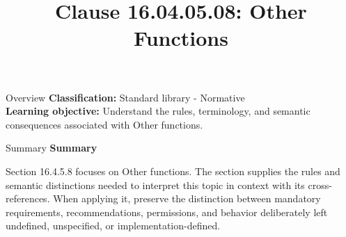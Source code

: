 \documentclass[10pt,letterpaper]{article}
\title{Clause 16.04.05.08: Other Functions}
\author{}
\date{}
\begin{document}
\maketitle
\begin{CornellOverviewBox}{Overview}
\textbf{Classification:} Standard library - Normative\\[2pt]
\textbf{Learning objective:} Understand the rules, terminology, and semantic consequences associated with Other functions.
\end{CornellOverviewBox}\begin{CornellSummaryBox}{Summary}
{\sffamily\bfseries\color{Accent} Summary}\par\vspace{3pt}Section 16.4.5.8 focuses on Other functions. The section supplies the rules and semantic distinctions needed to interpret this topic in context with its cross-references. When applying it, preserve the distinction between mandatory requirements, recommendations, permissions, and behavior deliberately left undefined, unspecified, or implementation-defined.
\end{CornellSummaryBox}
\end{document}
